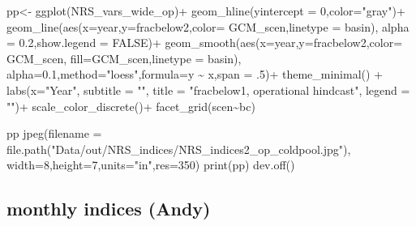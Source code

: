 \documentclass[
]{article}
\newenvironment{Shaded}{\begin{snugshade}}{\end{snugshade}}
\newcommand{\AttributeTok}[1]{\textcolor[rgb]{0.77,0.63,0.00}{#1}}
\newcommand{\ConstantTok}[1]{\textcolor[rgb]{0.00,0.00,0.00}{#1}}
\newcommand{\DecValTok}[1]{\textcolor[rgb]{0.00,0.00,0.81}{#1}}
\newcommand{\FloatTok}[1]{\textcolor[rgb]{0.00,0.00,0.81}{#1}}
\newcommand{\FunctionTok}[1]{\textcolor[rgb]{0.00,0.00,0.00}{#1}}
\newcommand{\NormalTok}[1]{#1}
\newcommand{\OtherTok}[1]{\textcolor[rgb]{0.56,0.35,0.01}{#1}}
\newcommand{\SpecialCharTok}[1]{\textcolor[rgb]{0.00,0.00,0.00}{#1}}
\newcommand{\StringTok}[1]{\textcolor[rgb]{0.31,0.60,0.02}{#1}}
\begin{document}
\begin{Shaded}
\begin{Highlighting}[]
     
\NormalTok{      pp}\OtherTok{\textless{}{-}} \FunctionTok{ggplot}\NormalTok{(NRS\_vars\_wide\_op)}\SpecialCharTok{+}
        \FunctionTok{geom\_hline}\NormalTok{(}\AttributeTok{yintercept =} \DecValTok{0}\NormalTok{,}\AttributeTok{color=}\StringTok{"gray"}\NormalTok{)}\SpecialCharTok{+}
        \FunctionTok{geom\_line}\NormalTok{(}\FunctionTok{aes}\NormalTok{(}\AttributeTok{x=}\NormalTok{year,}\AttributeTok{y=}\NormalTok{fracbelow2,}\AttributeTok{color=}\NormalTok{ GCM\_scen,}\AttributeTok{linetype =}\NormalTok{ basin),}
                  \AttributeTok{alpha =} \FloatTok{0.2}\NormalTok{,}\AttributeTok{show.legend =} \ConstantTok{FALSE}\NormalTok{)}\SpecialCharTok{+}
        \FunctionTok{geom\_smooth}\NormalTok{(}\FunctionTok{aes}\NormalTok{(}\AttributeTok{x=}\NormalTok{year,}\AttributeTok{y=}\NormalTok{fracbelow2,}\AttributeTok{color=}\NormalTok{ GCM\_scen,}
                        \AttributeTok{fill=}\NormalTok{GCM\_scen,}\AttributeTok{linetype =}\NormalTok{ basin),}
                    \AttributeTok{alpha=}\FloatTok{0.1}\NormalTok{,}\AttributeTok{method=}\StringTok{"loess"}\NormalTok{,}\AttributeTok{formula=}\StringTok{\textquotesingle{}y \textasciitilde{} x\textquotesingle{}}\NormalTok{,}\AttributeTok{span =}\NormalTok{ .}\DecValTok{5}\NormalTok{)}\SpecialCharTok{+}
        \FunctionTok{theme\_minimal}\NormalTok{() }\SpecialCharTok{+} 
        \FunctionTok{labs}\NormalTok{(}\AttributeTok{x=}\StringTok{"Year"}\NormalTok{,}
             \AttributeTok{subtitle =} \StringTok{""}\NormalTok{,}
             \AttributeTok{title =} \StringTok{"fracbelow1, operational hindcast"}\NormalTok{,}
             \AttributeTok{legend =} \StringTok{""}\NormalTok{)}\SpecialCharTok{+}
        \FunctionTok{scale\_color\_discrete}\NormalTok{()}\SpecialCharTok{+} \FunctionTok{facet\_grid}\NormalTok{(scen}\SpecialCharTok{\textasciitilde{}}\NormalTok{bc)}
     
\NormalTok{     pp}
      \FunctionTok{jpeg}\NormalTok{(}\AttributeTok{filename =} \FunctionTok{file.path}\NormalTok{(}\StringTok{"Data/out/NRS\_indices/NRS\_indices2\_op\_coldpool.jpg"}\NormalTok{),}
          \AttributeTok{width=}\DecValTok{8}\NormalTok{,}\AttributeTok{height=}\DecValTok{7}\NormalTok{,}\AttributeTok{units=}\StringTok{"in"}\NormalTok{,}\AttributeTok{res=}\DecValTok{350}\NormalTok{)}
     \FunctionTok{print}\NormalTok{(pp)}
     \FunctionTok{dev.off}\NormalTok{()}
\end{Highlighting}
\end{Shaded}

\hypertarget{monthly-indices-andy}{%
\subsection{monthly indices (Andy)}\label{monthly-indices-andy}}
\end{document}
